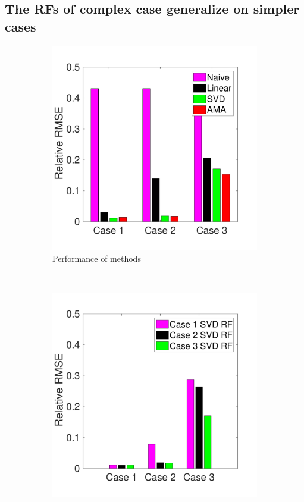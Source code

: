 \documentclass{jov}
\begin{document}
\subsection{The RFs of complex case generalize on simpler cases}
\begin{figure}
\centering
\begin{subfigure}{0.3 \textwidth}
	\includegraphics[width=\textwidth]{../Figures/Figure14/Figure14_a.pdf}
	\caption{Performance of methods}
	\label{fig:summaryBarGraph}
    \end{subfigure}
    ~ %
    \begin{subfigure}{0.3 \textwidth}   
	\includegraphics[width=\textwidth]{../Figures/Figure14/Figure14_b.pdf}

\end{subfigure}
\end{figure}
\end{document}
